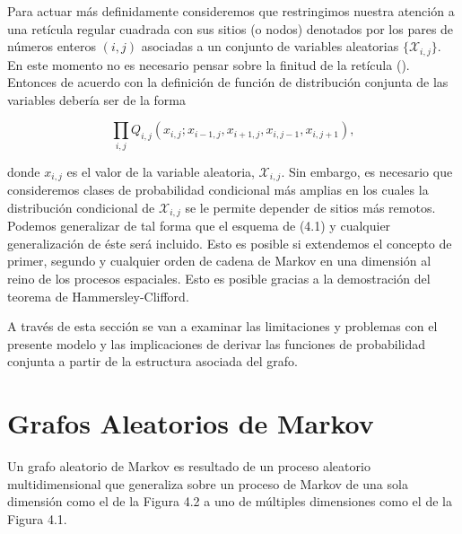 Para actuar más definidamente consideremos que restringimos nuestra atención a una retícula regular cuadrada con sus sitios (o nodos) denotados por los pares de números enteros $(i,j)$ asociadas a un conjunto de variables aleatorias $\{\mathcal{X}_{i,j}\}$. En este momento no es necesario pensar sobre la finitud de la retícula (\cite{Besag1974}). Entonces de acuerdo con \cite{Besag1974} la definición de función de distribución conjunta de las variables debería ser de la forma 

\begin{equation}
        \prod _ { i , j } Q _ { i , j } \left( x _ { i , j } ; x _ { i - 1 , j } , x _ { i + 1 , j } , x _ { i , j - 1 } , x _ { i , j + 1 } \right),
\end{equation}

donde $x_{i,j}$ es el valor de la variable aleatoria, $\mathcal{X}_{i,j}$. Sin embargo, es necesario que consideremos clases de probabilidad condicional más amplias en los cuales la distribución condicional de $\mathcal{X}_{i,j}$ se le permite depender de sitios más remotos. Podemos generalizar de tal forma que el esquema de (4.1) y cualquier generalización de éste será incluido. Esto es posible si extendemos el concepto de primer, segundo y cualquier orden de cadena de Markov en una dimensión al reino de los procesos espaciales. Esto es posible gracias a la demostración del teorema de Hammersley-Clifford.

A través de esta sección se van a examinar las limitaciones y problemas con el presente modelo y las implicaciones de derivar las funciones de probabilidad conjunta a partir de la estructura asociada del grafo. 



\section{Grafos Aleatorios de Markov}



Un grafo aleatorio de Markov es resultado de un proceso aleatorio multidimensional que generaliza sobre un proceso de Markov de una sola dimensión como el de la Figura 4.2 a uno de múltiples dimensiones como el de la Figura 4.1.

